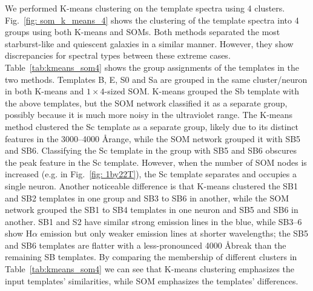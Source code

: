     We performed K-means clustering on the  template spectra using 4 clusters.
    Fig.~\ref{fig: som_k_means_4} shows the clustering of the template spectra into 4 groups using both K-means and SOMs.
    Both methods separated the most starburst-like and quiescent galaxies in a similar manner.
    However, they show discrepancies for spectral types between these extreme cases.
    Table~\ref{tab:kmeans_som4} shows the group assignments of the  templates in the two methods.
    Templates B, E, S0 and Sa are grouped in the same cluster/neuron in both K-means and $1\times4$-sized SOM. 
    K-means grouped the Sb template with the above templates, but the SOM network classified it as a separate group, possibly because it is much more noisy in the ultraviolet range.
    The K-means method clustered the Sc template as a separate group, 
    likely due to its distinct features in the 3000--4000 \AA range, while the SOM network grouped it with SB5 and SB6. 
    Classifying the Sc template in the group with SB5 and SB6 obscures the peak feature in the Sc template.
    However, when the number of SOM nodes is increased (e.g. in Fig.~\ref{fig: 1by22T}), the Sc template separates and occupies a single neuron.
    Another noticeable difference is that K-means clustered the SB1 and SB2 templates in one group and SB3 to SB6 in another, while the SOM network grouped the SB1 to SB4 templates in one neuron and SB5 and SB6 in another.
    SB1 and S2 have similar strong emission lines in the blue, while SB3--6 show H$\alpha$ emission but only weaker emission lines at shorter wavelengths;
    the SB5 and SB6 templates are flatter with a less-pronounced 4000 \AA break than the remaining SB templates.
    By comparing the membership of different clusters in Table~\ref{tab:kmeans_som4} we can see that K-means clustering emphasizes the input templates' similarities, while SOM emphasizes the templates' differences.
     
